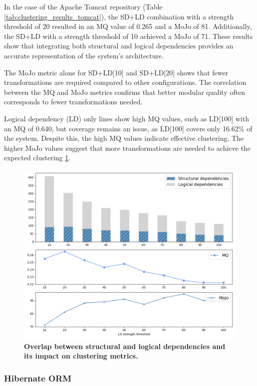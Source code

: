 \documentclass{ieeeaccess}
\begin{document}
In the case of the Apache Tomcat repository (Table \ref{tab:clustering_results_tomcat}), the SD+LD combination with a strength threshold of 20 resulted in an MQ value of 0.265 and a MoJo of 81. Additionally, the SD+LD with a strength threshold of 10 achieved a MoJo of 71. These results show that integrating both structural and logical dependencies provides an accurate representation of the system's architecture.

The MoJo metric alone for SD+LD[10] and SD+LD[20] shows that fewer transformations are required compared to other configurations. The correlation between the MQ and MoJo metrics confirms that better modular quality often corresponds to fewer transformations needed.

Logical dependency (LD) only lines show high MQ values, such as LD[100] with an MQ of 0.640, but coverage remains an issue, as LD[100] covers only 16.62\% of the system. Despite this, the high MQ values indicate effective clustering. The higher MoJo values suggest that more transformations are needed to achieve the expected clustering  \ref{fig:catalina_correlation}.

\begin{figure}[t!]
  \centering
  \includegraphics[width=\columnwidth]{catalina_correlation.png}
  \caption{\textbf{Overlap between structural and logical dependencies and its impact on clustering metrics.}}
  \label{fig:catalina_correlation}
\end{figure}

\subsubsection{Hibernate ORM}
\end{document}
